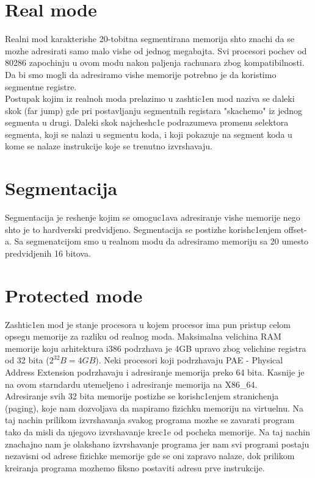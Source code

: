 \documentclass[a4paper,fleqn,12pt]{JMThesis}
\newcommand\eng{\fontencoding{OT1}\fontfamily{\rmdefault}\selectfont}
\begin{document}
\section{{\eng Real mode}}
\medskip

Realni mod karakterishe 20-tobitna segmentirana memorija shto znachi da se
mozhe adresirati samo malo vishe od jednog megabajta. Svi procesori pochev od
80286 zapochinju u ovom modu nakon paljenja rachunara zbog kompatibilnosti. Da
bi smo mogli da adresiramo vishe memorije potrebno je da koristimo segmentne
registre.\\

Postupak kojim iz realnoh moda prelazimo u zashtic1en mod naziva se daleki skok
{\eng (far jump)} gde pri postavljanju segmentnih registara "skachemo" iz
jednog segmenta u drugi. Daleki skok najchesh\/c1e podrazumeva promenu selektora
segmenta, koji se nalazi u segmentu koda, i koji pokazuje na segment koda u
kome se nalaze instrukcije koje se trenutno izvrshavaju.

\section{Segmentacija}
\medskip

Segmentacija je reshenje kojim se omoguc1ava adresiranje vishe memorije nego
shto je to hardverski predvidjeno. Segmentacija se postizhe korish\/c1enjem
{\eng offset}-a. Sa segmenatcijom smo u realnom modu da adresiramo memoriju sa
20 umesto predvidjenih 16 bitova.

\section{{\eng Protected mode}}
\medskip

Zashtic1en mod je stanje procesora u kojem procesor ima pun pristup celom
opsegu memorije za razliku od realnog moda. Maksimalna velichina {\eng RAM}
memorije koju arhitektura {\eng i386} podrzhava je {\eng 4GB} upravo zbog
velichine registra od 32 bita ($2^{32}B = 4GB$). Neki procesori koji
podrzhavaju {\eng PAE - Physical Address Extension} podrzhavaju i adresiranje
memorija preko 64 bita. Kasnije je na ovom starndardu utemeljeno i adresiranje
memorija na {\eng X86\_64}.\\

Adresiranje svih 32 bita memorije postizhe se  korish\/c1enjem stranichenja
({\eng paging}), koje nam dozvoljava da mapiramo fizichku memoriju na
virtuelnu. Na taj nachin prilikom izvrshavanja svakog programa mozhe se
zavarati program tako da misli da njegovo izvrshavanje krec1e od pocheka
memorije. Na taj nachin znachajno nam je olakshano izvrshavanje programa jer
nam svi programi postaju nezavisni od adrese fizichke memorije gde se oni
zapravo nalaze, dok prilikom kreiranja programa mozhemo fiksno postaviti adresu
prve instrukcije.
\end{document}
